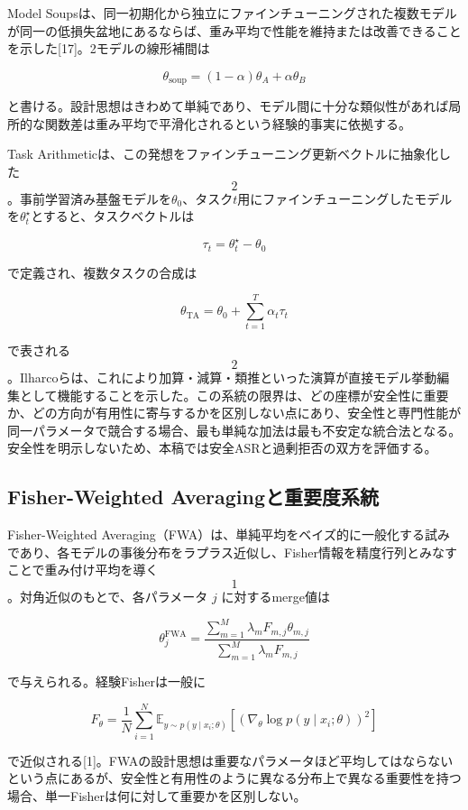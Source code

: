 Model Soupsは、同一初期化から独立にファインチューニングされた複数モデルが同一の低損失盆地にあるならば、重み平均で性能を維持または改善できることを示した[17]。2モデルの線形補間は

\[
\theta_{\mathrm{soup}}=(1-\alpha)\theta_A+\alpha\theta_B
\tag{1}
\]

と書ける。設計思想はきわめて単純であり、モデル間に十分な類似性があれば局所的な関数差は重み平均で平滑化されるという経験的事実に依拠する。

Task Arithmeticは、この発想をファインチューニング更新ベクトルに抽象化した\[2\]。事前学習済み基盤モデルを\(\theta_0\)、タスク\(t\)用にファインチューニングしたモデルを\(\theta_t^\star\)とすると、タスクベクトルは

\[
\tau_t=\theta_t^\star-\theta_0
\tag{2}
\]

で定義され、複数タスクの合成は

\[
\theta_{\mathrm{TA}}=\theta_0+\sum_{t=1}^{T}\alpha_t\tau_t
\tag{3}
\]

で表される\[2\]。Ilharcoらは、これにより加算・減算・類推といった演算が直接モデル挙動編集として機能することを示した。この系統の限界は、どの座標が安全性に重要か、どの方向が有用性に寄与するかを区別しない点にあり、安全性と専門性能が同一パラメータで競合する場合、最も単純な加法は最も不安定な統合法となる。安全性を明示しないため、本稿では安全ASRと過剰拒否の双方を評価する。

\subsection{Fisher-Weighted Averagingと重要度系統}

Fisher-Weighted Averaging（FWA）は、単純平均をベイズ的に一般化する試みであり、各モデルの事後分布をラプラス近似し、Fisher情報を精度行列とみなすことで重み付け平均を導く\[1\]。対角近似のもとで、各パラメータ \(j\) に対するmerge値は

\[
\theta_j^{\mathrm{FWA}}=\frac{\sum_{m=1}^{M}\lambda_m F_{m,j}\theta_{m,j}}{\sum_{m=1}^{M}\lambda_m F_{m,j}}
\tag{4}
\]

で与えられる。経験Fisherは一般に

\[
\hat F_{\theta}=\frac{1}{N}\sum_{i=1}^{N}\mathbb{E}_{y\sim p(y\mid x_i;\theta)}\left[(\nabla_{\theta}\log p(y\mid x_i;\theta))^2\right]
\tag{5}
\]

で近似される[1]。FWAの設計思想は重要なパラメータほど平均してはならないという点にあるが、安全性と有用性のように異なる分布上で異なる重要性を持つ場合、単一Fisherは何に対して重要かを区別しない。

